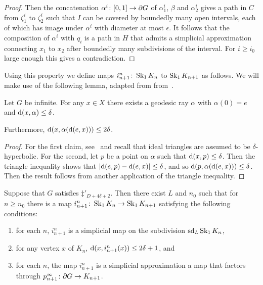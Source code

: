 \documentclass[a4paper]{article}
\begin{document}
\begin{proof}
  Then the concatenation $\alpha^i\colon[0,1]\to \partial G$ of $\alpha_1^i$,
  $\beta$ and $\alpha_2^i$ gives a path in $C$ from $\zeta_1^i$ to $\zeta_2^i$
  such that $I$ can be covered by boundedly many open intervals, each of which
  has image under $\alpha^i$ with diameter at most $\epsilon$. It follows that
  the composition of $\alpha^i$ with $q_i$ is a path in $H$ that admits a
  simplicial approximation connecting $x_1$ to $x_2$ after boundedly many
  subdivisions of the interval. For $i \geq i_0$ large enough this gives a
  contradiction.
\end{proof}

Using this property we define maps $i^n_{n+1}\colon \operatorname{Sk}_1 K_n$ to
$\operatorname{Sk}_1K_{n+1}$ as follows.  We will make use of the following lemma, adapted
from from~\cite{bestvinamess91}.

\begin{lemma}\cite{bestvinamess91}\label{lem:near_geod_rays}
  Let $G$ be infinite. For any $x \in X$ there exists a geodesic ray $\alpha$ 
  with $\alpha(0) = e$ and $\operatorname{d}(x,\alpha) \leq \delta$. 
  
  Furthermore, $\operatorname{d}(x, \alpha(\operatorname{d}(e,x))) \leq 2\delta$.
\end{lemma}

\begin{proof}
  For the first claim, see~\cite{bestvinamess91} and recall that ideal
  triangles are assumed to be $\delta$-hyperbolic. For the second, let $p$ be
  a point on $\alpha$ such that $\operatorname{d}(x, p) \leq \delta$. Then the triangle
  inequality shows that $\left|\operatorname{d}(e,p) - \operatorname{d}(e,x)\right| \leq \delta$, and so
  $\operatorname{d}(p, \alpha(\operatorname{d}(e,x))) \leq \delta$. Then the result follows from
  another application of the triangle inequality.
\end{proof}

\begin{proposition}\label{prop:i_in_dimension_1}
  Suppose that $G$ satisfies $\ddag'_{D + 4\delta+2}$. Then there exist $L$ and
  $n_0$ such that for $n\geq n_0$ there is a map $i^n_{n+1}\colon \operatorname{Sk}_1 K_n
  \to \operatorname{Sk}_1 K_{n+1}$ satisfying the following conditions:
  \begin{enumerate}
    \item for each $n$, $i^n_{n+1}$ is a simplicial map on the subdivision
      $\operatorname{sd}_L\operatorname{Sk}_1 K_n$,
    \item for any vertex $x$ of $K_n$, $\operatorname{d}(x, i^n_{n+1}(x)) \leq 2\delta+1$,
      and
    \item for each $n$, the map $i^n_{n+1}$ is a simplicial approximation a map
      that factors through $p^\infty_{n+1}\colon \partial G \to K_{n+1}$.
  \end{enumerate}
\end{proposition}
\end{document}
